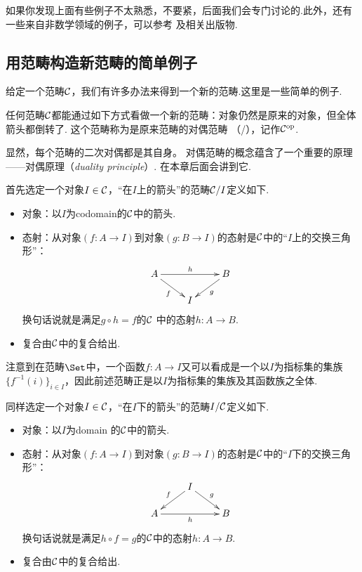   如果你发现上面有些例子不太熟悉，不要紧，后面我们会专门讨论的.此外，还有一些来自非数学领域的例子，可以参考
  \cite{awodey2010category}及相关出版物.

\subsection{用范畴构造新范畴的简单例子}
给定一个范畴${\cal C}$，我们有许多办法来得到一个新的范畴.这里是一些简单的例子.
\begin{exam}
  任何范畴${\cal C}$都能通过如下方式看做一个新的范畴：对象仍然是原来的对象，但全体箭头都倒转了. 这个范畴称为是原来范畴的对偶范畴
    （/），记作${\cal C}^{\operatorname{op}}$.
\end{exam}
显然，每个范畴的二次对偶都是其自身。
对偶范畴的概念蕴含了一个重要的原理——对偶原理（\emph{duality principle}）. 在本章后面会讲到它.
\begin{exam}
  首先选定一个对象$I\in{\cal C}$，“在$I$上的箭头”的范畴${\cal C}/I$定义如下.
  \begin{itemize}
    \item 对象：以$I$为codomain的${\cal C}$中的箭头.
    \item 态射：从对象$(f\colon A\to I)$到对象$(g\colon B\to I)$的态射是${\cal C}$中的“$I$上的交换三角形”：
               \begin{displaymath}
                 \xymatrix@R=0.5cm{
                    A\ar[rr]^{h}\ar[dr]_{f} && B\ar[dl]^{g} \\
                    &I&                }
               \end{displaymath}
               换句话说就是满足$g\circ h = f$的${\cal C}$ 中的态射$h\colon A\to B$.
    \item 复合由${\cal C}$中的复合给出.
  \end{itemize}
\end{exam}
  \begin{rem}
    注意到在范畴$\Set$中，一个函数$f\colon A\to I$又可以看成是一个以$I$为指标集的集族$\{f^{-1}(i)\}_{i\in I}$，因此前述范畴正是以$I$为指标集的集族及其函数族之全体.
  \end{rem}

\begin{exam}
  同样选定一个对象$I\in{\cal C}$，“在$I$下的箭头”的范畴$I/{\cal C}$定义如下.
  \begin{itemize}
    \item 对象：以$I$为domain 的${\cal C}$中的箭头.
    \item 态射：从对象$(f\colon A\to I)$到对象$(g\colon B\to I)$的态射是${\cal C}$中的“$I$下的交换三角形”：
               \begin{displaymath}
                 \xymatrix@R=0.5cm{
                    &I\ar[dl]_{f}\ar[dr]^{g}& \\
                    A\ar[rr]_{h} && B   }
               \end{displaymath}
               换句话说就是满足$h \circ f = g$的${\cal C}$中的态射$h\colon A\to B$.
    \item  复合由${\cal C}$中的复合给出.
  \end{itemize}
\end{exam}

